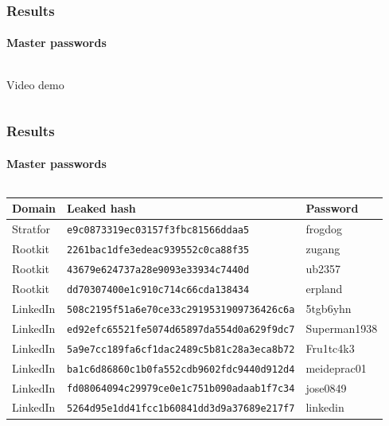 \documentclass[handout, notes=hide]{beamer}
\begin{document}

\begin{frame}
\frametitle{Results}
\framesubtitle{Master passwords}
\setlength{\parskip}{0.5em}

\begin{columns}[T]
\begin{column}[T]{1.0\textwidth}
\setlength{\parskip}{0.5em}
\centering
Video demo

\end{column}
\end{columns}


\end{frame}


\begin{frame}
\frametitle{Results}
\framesubtitle{Master passwords}
\setlength{\parskip}{0.5em}

\begin{columns}[T]
\begin{column}[T]{1.0\textwidth}
\setlength{\parskip}{0.5em}

\fontsize{8pt}{15}\selectfont

\begin{tabular}{p{1.8cm}|p{6cm}|p{1.8cm}}
	{\bf Domain} & {\bf Leaked hash} & {\bf Password} \\ \hline
	Stratfor & {\tt e9c0873319ec03157f3fbc81566ddaa5} & frogdog \\
	Rootkit & {\tt 2261bac1dfe3edeac939552c0ca88f35} & zugang \\
	Rootkit & {\tt 43679e624737a28e9093e33934c7440d} & ub2357 \\
	Rootkit & {\tt dd70307400e1c910c714c66cda138434} & erpland \\
	LinkedIn & {\tt 508c2195f51a6e70ce33c2919531909736426c6a} & 5tgb6yhn \\
	LinkedIn & {\tt ed92efc65521fe5074d65897da554d0a629f9dc7} & Superman1938 \\
	LinkedIn & {\tt 5a9e7cc189fa6cf1dac2489c5b81c28a3eca8b72} & Fru1tc4k3 \\
	LinkedIn & {\tt ba1c6d86860c1b0fa552cdb9602fdc9440d912d4} & meideprac01 \\
	LinkedIn & {\tt fd08064094c29979ce0e1c751b090adaab1f7c34} & jose0849 \\
	LinkedIn & {\tt 5264d95e1dd41fcc1b60841dd3d9a37689e217f7} & linkedin
\end{tabular}

\end{column}
\end{columns}


\end{frame}
\end{document}
